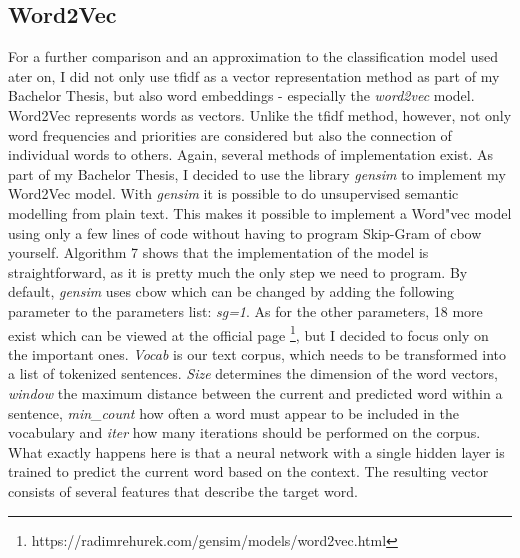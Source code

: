 \documentclass[a4paper, 11pt,titlepage,oneside,openany]{book}
\begin{document}
\newpage
\subsection{Word2Vec} 
For a further comparison and an approximation to the classification model used ater on, I did not only use \gls{tfidf} as a vector representation method as part of my Bachelor Thesis, but also word embeddings - especially the \textit{word2vec} model. \\
Word2Vec represents words as vectors. Unlike the  \gls{tfidf} method, however, not only word frequencies and priorities are considered but also the connection of individual words to others. Again, several methods of implementation exist. 
\noindent As part of my Bachelor Thesis, I decided to use  the library \textit{gensim} \cite{gensim} to implement my Word2Vec model. With \textit{gensim} it is  possible to do  unsupervised semantic modelling from plain text. This makes it possible to implement a Word"vec model using only a few lines of code without having to program Skip-Gram of \gls{cbow} yourself. 
 Algorithm 7 shows that the implementation of the model is straightforward, as it is pretty much the only step we need to program. By default, \textit{gensim} uses \gls{cbow} which can be  changed  by adding the following parameter to the parameters list: \textit{sg=1}. As for the other parameters, 18 more exist which can be viewed at the official  page \footnote{https://radimrehurek.com/gensim/models/word2vec.html}, but I decided to focus only on the important ones. \textit{Vocab} is our text corpus, which needs to be transformed into a list of tokenized sentences. \textit{Size} determines the dimension of the word vectors, \textit{window} the maximum distance between the current and predicted word within a sentence, \textit{min\_count}  how often a word must appear to be included in the vocabulary and \textit{iter} how many iterations  should be performed on the corpus. What exactly happens here is that a neural network with a single hidden layer is trained to predict the current word based on the context. The resulting vector consists of several features that describe the target word.
\end{document}
